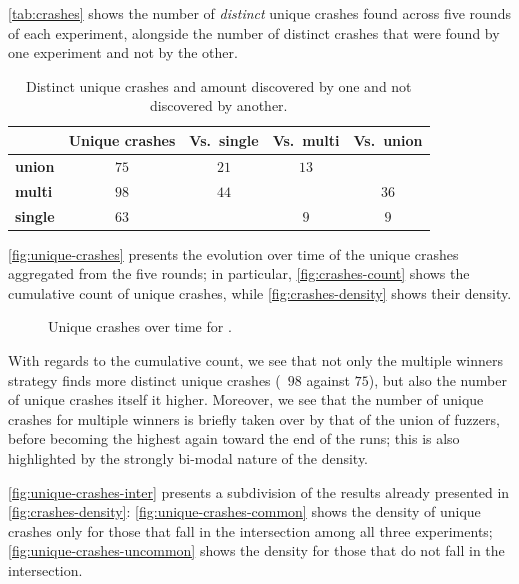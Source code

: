 \autoref{tab:crashes} shows the number of \emph{distinct} unique crashes found
across five rounds of each experiment, alongside the number of distinct crashes
that were found by one experiment and not by the other.

\begin{table}[h]
    \centering%
    \begin{tabular}{l c c c c}
        & \textbf{Unique crashes} & \textbf{Vs.\ single} &
            \textbf{Vs.\ multi} & \textbf{Vs.\ union} \\
        \bottomrule%
        \textbf{union} & $75$ & $21$ & $13$ & \\
        \hline%
        \textbf{multi} & $98$ & $44$ & & $36$ \\
        \hline%
        \textbf{single} & $63$ & & $9$ & $9$
    \end{tabular}
    \caption{Distinct unique crashes and amount discovered by one and not
    discovered by another.}
    \label{tab:crashes}
\end{table}

\autoref{fig:unique-crashes} presents the evolution over time of the unique
crashes aggregated from the five rounds; in particular,
\autoref{fig:crashes-count} shows the cumulative count of unique crashes, while
\autoref{fig:crashes-density} shows their density.

\begin{figure}[h]
    \centering%
    \caption{Unique crashes over time for \listswf.}
    \label{fig:unique-crashes}
\end{figure}

With regards to the cumulative count, we see that not only the multiple winners
strategy finds more distinct unique crashes (\ie~$98$ against $75$), but also
the number of unique crashes itself it higher. Moreover, we see that the number
of unique crashes for multiple winners is briefly taken over by that of the
union of fuzzers, before becoming the highest again toward the end of the runs;
this is also highlighted by the strongly bi-modal nature of the density.

\autoref{fig:unique-crashes-inter} presents a subdivision of the results already
presented in \autoref{fig:crashes-density}: \autoref{fig:unique-crashes-common}
shows the density of unique crashes only for those that fall in the intersection
among all three experiments; \autoref{fig:unique-crashes-uncommon} shows the
density for those that do not fall in the intersection.

